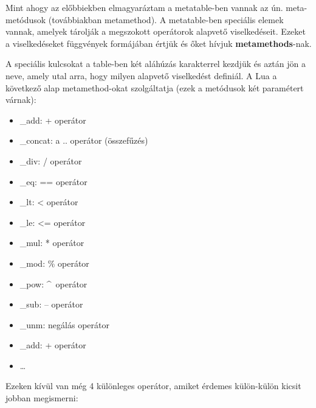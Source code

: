 Mint ahogy az előbbiekben elmagyaráztam a metatable-ben vannak az ún. meta-metódusok (továbbiakban metamethod). A metatable-ben speciális elemek vannak, amelyek tárolják a megszokott operátorok alapvető viselkedéseit. Ezeket a viselkedéseket függvények formájában értjük és őket hívjuk \textbf{metamethods}-nak. 

A speciális kulcsokat a table-ben két aláhúzás karakterrel kezdjük és aztán jön a neve, amely utal arra, hogy milyen alapvető viselkedést definiál. A Lua a következő alap metamethod-okat szolgáltatja  (ezek a metódusok két paramétert várnak):
\begin{itemize}
	\item \_add: + operátor
	\item \_concat: a .. operátor (összefűzés)
	\item \_div: / operátor
	\item \_eq: == operátor
	\item \_lt: < operátor 
	\item \_le: <= operátor 
	\item \_mul: * operátor 
	\item \_mod: \% operátor
	\item \_pow: \^~operátor 
	\item \_sub: -- operátor 
	\item \_unm: negálás operátor
	\item \_add: + operátor
	\item \dots
\end{itemize} 
Ezeken kívül van még 4 különleges operátor, amiket érdemes külön-külön kicsit jobban megismerni:
